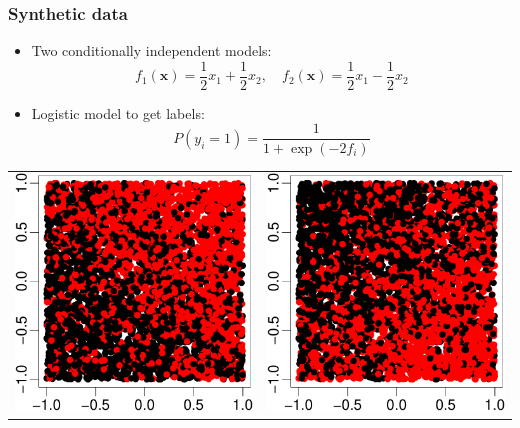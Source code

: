 \documentclass[]{beamer}
\renewcommand{\Pr}{P}
\newcommand{\bx}{\boldsymbol{x}}
\begin{document}
\begin{frame}
\frametitle{Synthetic data}

\begin{itemize}
\item Two conditionally independent models:
$$
f_1(\bx) = \frac{1}{2} x_1 + \frac{1}{2} x_2, \quad f_2(\bx) = \frac{1}{2} x_1 - \frac{1}{2} x_2 
$$
\item Logistic model to get labels:
$$
\Pr(y_i = 1) = \frac{1}{1 + \exp(-2f_i)}
$$
\end{itemize}
\vskip12pt
\begin{center}
\begin{tabular}{@{}c@{$\quad\quad\quad$}c@{}}
\includegraphics[width = .35\textwidth]{pics/ind-1.pdf} &
\includegraphics[width = .35\textwidth]{pics/ind-2.pdf} \\
\end{tabular}
\end{center}

\end{frame}
\end{document}
